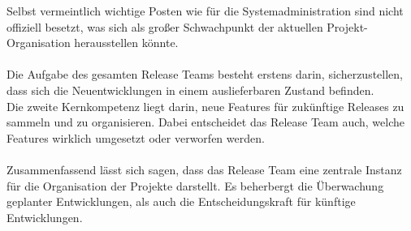 \documentclass[10pt,a4paper,twocolumn]{article}
\begin{document}
Selbst vermeintlich wichtige Posten wie für die Systemadministration sind nicht offiziell besetzt, was sich als großer Schwachpunkt der aktuellen Projekt-Organisation herausstellen könnte.\\ \\
Die Aufgabe des gesamten Release Teams besteht erstens darin, sicherzustellen, dass sich die Neuentwicklungen in einem auslieferbaren Zustand befinden.\\
Die zweite Kernkompetenz liegt darin, neue Features für zukünftige Releases zu sammeln und zu organisieren. Dabei entscheidet das Release Team auch, welche Features wirklich umgesetzt oder verworfen werden. \cite{KDEReleaseTeam} \\ \\
Zusammenfassend lässt sich sagen, dass das Release Team eine zentrale Instanz für die Organisation der Projekte darstellt. Es beherbergt die Überwachung geplanter Entwicklungen, als auch die Entscheidungskraft für künftige Entwicklungen.
\end{document}
